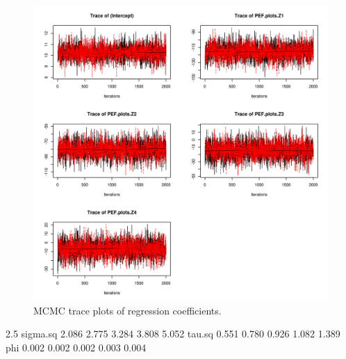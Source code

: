 \documentclass{article}
\begin{document}
\begin{figure}
\begin{center}
\includegraphics[width=12cm]{figures/fig-betaSamples}
\end{center}
\caption{MCMC trace plots of regression coefficients.}
\label{fig:betaSamples}
\end{figure}

\begin{Schunk}
\begin{Soutput}
          2.5%
sigma.sq 2.086 2.775 3.284 3.808 5.052
tau.sq   0.551 0.780 0.926 1.082 1.389
phi      0.002 0.002 0.002 0.003 0.004
\end{Soutput}
\end{Schunk}
\end{document}
